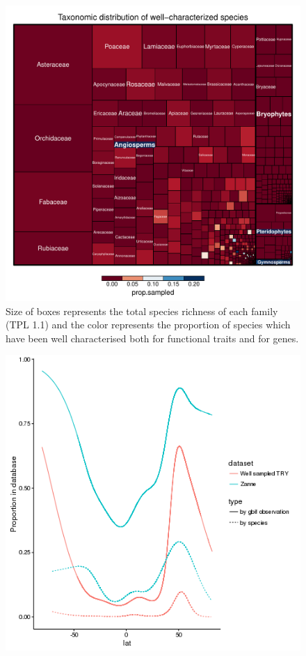 \documentclass[a4paper,11pt]{article}
\begin{document}
\begin{figure}[h!]
\centering
  \includegraphics[width=\textwidth]{figures/treemap_well_known.pdf}
  \caption{Size of boxes represents the total species richness of each family (TPL 1.1) and the color represents the proportion of species which have been 
  well characterised both for functional traits and for genes.}
\end{figure}

\begin{figure}[h!]
\centering
  \includegraphics[width=\textwidth]{figures/multi_gam_zae_diaz.png}
  \label{fig:zanne_diaz_gam}
\end{figure}
\end{document}
